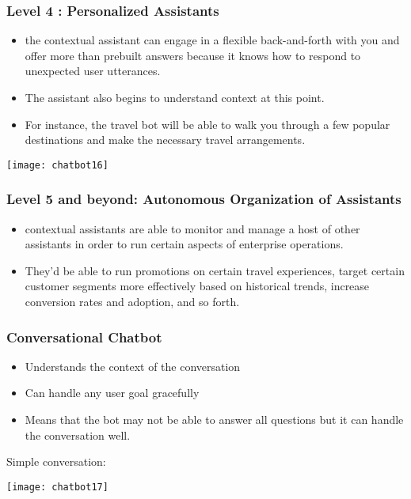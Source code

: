 \begin{frame}[fragile]\frametitle{Level 4 : Personalized Assistants}
\begin{itemize}
\item the contextual assistant can engage in a flexible back-and-forth with you and offer more than prebuilt answers because it knows how to respond to unexpected user utterances. 
\item The assistant also begins to understand context at this point. 
\item For instance, the travel bot will be able to walk you through a few popular destinations and make the necessary travel arrangements.
\end{itemize}

\begin{center}
\texttt{[image: chatbot16]}
\end{center}

\end{frame}

\begin{frame}[fragile]\frametitle{Level 5 and beyond: Autonomous Organization of Assistants}
\begin{itemize}
\item contextual assistants are able to monitor and manage a host of other assistants in order to run certain aspects of enterprise operations. 
\item They’d be able to run promotions on certain travel experiences, target certain customer segments more effectively based on historical trends, increase conversion rates and adoption, and so forth.
\end{itemize}


\end{frame}


\begin{frame}[fragile]\frametitle{Conversational Chatbot}

\begin{itemize}
\item Understands the context of the conversation
\item Can handle any user goal gracefully
\item Means that the bot may not be able to answer all questions but it can handle the conversation well.
\end{itemize}

Simple conversation:
\begin{center}
\texttt{[image: chatbot17]}
\end{center}


\end{frame}

